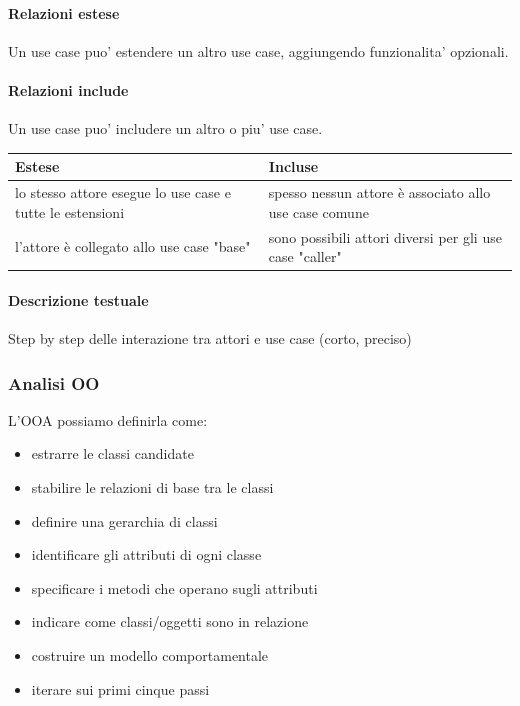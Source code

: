\documentclass[a4paper,12pt]{article}
\begin{document}
\paragraph{Relazioni estese} Un use case puo' estendere un altro use case, aggiungendo funzionalita' opzionali.\\
\paragraph{Relazioni include} Un use case puo' includere un altro o piu' use case.\\
\begin{center}
\begin{tabular}{|p{}|p{}|}
\hline
\textbf{Estese} & \textbf{Incluse} \\
\hline
lo stesso attore esegue lo use case e tutte le estensioni
& spesso nessun attore è associato allo use case comune \\
\hline
l'attore è collegato allo use case "base"
& sono possibili attori diversi per gli use case "caller" \\
\hline
\end{tabular}
\end{center}
\paragraph{Descrizione testuale} Step by step delle interazione tra attori e use case (corto, preciso)\\
\subsubsection{Analisi OO}
L'OOA possiamo definirla come:
\begin{itemize}
  \item estrarre le classi candidate
  \item stabilire le relazioni di base tra le classi
  \item definire una gerarchia di classi
  \item identificare gli attributi di ogni classe
  \item specificare i metodi che operano sugli attributi
  \item indicare come classi/oggetti sono in relazione
  \item costruire un modello comportamentale
  \item iterare sui primi cinque passi
\end{itemize}
\end{document}
